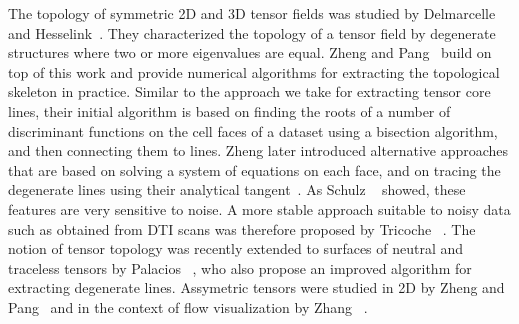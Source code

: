 %
The topology of symmetric \ac{2D} and \ac{3D} tensor fields was studied by
Delmarcelle~\cite{Delmarcelle1994} and Hesselink~\cite{Hesselink1997}.
%
They characterized the topology of a tensor field by degenerate structures
where two or more eigenvalues are equal.
%
Zheng and Pang~\cite{Zheng2004} build on top of this work and provide
numerical algorithms for extracting the topological skeleton in practice.
%
Similar to the approach we take for extracting tensor core lines, their initial
algorithm is based on finding the roots of a number of discriminant functions on
the cell faces of a dataset using a bisection algorithm, and then connecting
them to lines.
%
Zheng \etal later introduced alternative approaches that are based on solving
a system of equations on each face, and on tracing the degenerate lines using
their analytical tangent~\cite{Zheng2005}.
%
As Schulz \etal~\cite{Schultz2007} showed, these features are very sensitive to
noise.
%
A more stable approach suitable to noisy data such as obtained from DTI scans
was therefore proposed by Tricoche \etal~\cite{Tricoche2008}.
%
The notion of tensor topology was recently extended to surfaces of neutral and
traceless tensors by Palacios \etal~\cite{Palacios2016}, who also propose an
improved algorithm for extracting degenerate lines.
%
Assymetric tensors were studied in 2D by Zheng and Pang~\cite{Zheng2005a} and
in the context of flow visualization by Zhang \etal~\cite{Zhang2009}.
%

